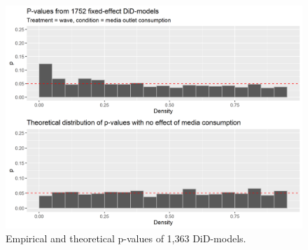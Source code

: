 \documentclass{article}
\begin{document}
\begin{figure}[!ht]
    \centering
    \includegraphics[width=\textwidth]{paper/vis/DiD_model_ps.png}
    \caption{Empirical and theoretical p-values of 1,363 DiD-models.}
    \label{fig:p_values}
\end{figure}
\end{document}
